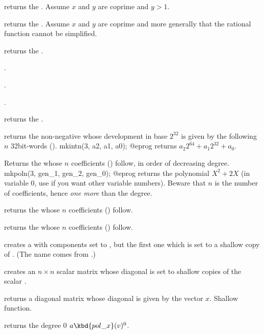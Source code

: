 returns the  . Assume $x$ and $y$ are coprime and $y > 1$.

returns the  . Assume $x$ and $y$ are coprime and more
generally that the rational function cannot be simplified.

returns the  .

.

.

.

returns the  .

\smallskip

 returns the non-negative  whose
development in base $2^{32}$ is given by the following $n$ 32bit-words
().
\bprog
  mkintn(3, a2, a1, a0);
@eprog
\noindent returns $a_2 2^{64} + a_1 2^{32} + a_0$.

 Returns the  whose $n$
coefficients () follow, in order of decreasing degree.
\bprog
  mkpoln(3, gen_1, gen_2, gen_0);
@eprog
\noindent returns the polynomial $X^2 + 2X$ (in variable $0$, use
 if you want other variable numbers). Beware that $n$ is the
number of coefficients, hence \emph{one more} than the degree.

 returns the  whose $n$
coefficients () follow.

 returns the  whose $n$
coefficients () follow.

 creates a  with 
components set to , but the first one which is set to a shallow
copy of . (The name comes from .)

 creates an $n\times n$
scalar matrix whose diagonal is set to shallow copies of the scalar .

 returns a diagonal matrix whose diagonal
is given by the vector $x$. Shallow function.

 returns the degree $0$
 $a \kbd{pol\_x}(v)^0$.

